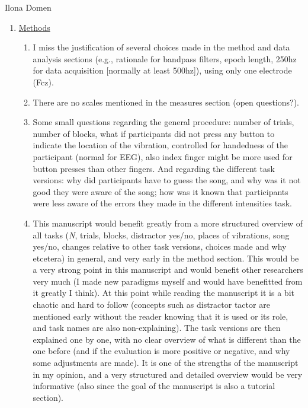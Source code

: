 \documentclass[twocolumn, serif, authordate, review]{jote-article}
\begin{document}
\begin{paracol}{2}
\begin{reviewend}{Ilona Domen}
\begin{enumerate}[label=\textbf{\arabic*}), start=0]
    \item \hyperref[sec:methods]{Methods}
        \begin{enumerate}
            \item I miss the justification of several choices made in the method and data analysis sections (e.g., rationale for bandpass filters, epoch length, 250hz for data acquisition [normally at least 500hz]), using only one electrode (Fcz). 
            \item There are no scales mentioned in the measures section (open questions?).
            \item Some small questions regarding the general procedure: number of trials, number of blocks, what if participants did not press any button to indicate the location of the vibration, controlled for handedness of the participant (normal for EEG), also index finger might be more used for button presses than other fingers. And regarding the different task versions: why did participants have to guess the song, and why was it not good they were aware of the song; how was it known that participants were less aware of the errors they made in the different intensities task.
            \item This manuscript would benefit greatly from a more structured overview of all tasks (\textit{N}, trials, blocks, distractor yes/no, places of vibrations, song yes/no, changes relative to other task versions, choices made and why etcetera) in general, and very early in the method section. This would be a very strong point in this manuscript and would benefit other researchers very much (I made new paradigms myself and would have benefitted from it greatly I think). At this point while reading the manuscript it is a bit chaotic and hard to follow (concepts such as distractor tactor are mentioned early without the reader knowing that it is used or its role, and task names are also non-explaining). The task versions are then explained one by one, with no clear overview of what is different than the one before (and if the evaluation is more positive or negative, and why some adjustments are made). It is one of the strengths of the manuscript in my opinion, and a very structured and detailed overview would be very informative (also since the goal of the manuscript is also a tutorial section).

\end{enumerate}
\end{enumerate}
\end{reviewend}
\end{paracol}
\end{document}
